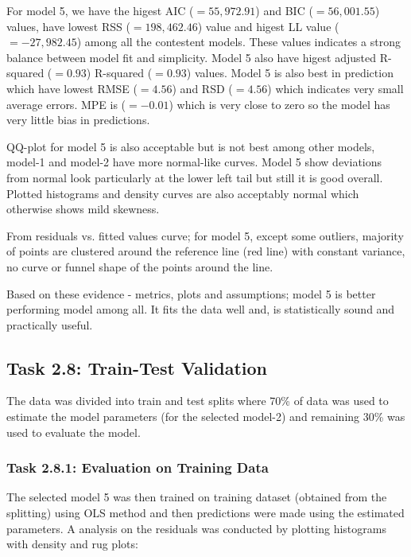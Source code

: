 \documentclass[12pt,a4paper]{article}
\begin{document}
For model 5, we have the higest AIC ($=55,972.91$) and BIC ($=56,001.55$) values, 
have lowest RSS ($=198,462.46$) value and higest LL value ($=-27,982.45$) among 
all the contestent models. These values indicates a strong 
balance between model fit and simplicity. Model 
5 also have higest adjusted R-squared ($=0.93$) R-squared ($=0.93$) values. 
Model 5 is also best in prediction which have lowest 
RMSE ($=4.56$) and RSD ($=4.56$) which indicates  
very small average errors. MPE is ($= -0.01$) 
which is very close to zero so the model 
has very little bias in predictions. 

QQ-plot for model 5 is also acceptable but is not best among other models, model-1 and model-2 have 
more normal-like curves. Model 5 show deviations from normal look particularly at the lower left tail
but still it is good overall. Plotted histograms and density curves are also acceptably normal which 
otherwise shows mild skewness. 

From residuals vs. fitted values curve; for model 5, except some outliers, 
majority of points are clustered around the reference line (red line) 
with constant variance, no curve or funnel shape of the points around 
the line. 

Based on these evidence - metrics, plots and assumptions; 
model 5 is better performing model among all. It fits the 
data well and, is statistically sound and practically 
useful. 


\subsection*{Task 2.8: Train-Test Validation}
The data was divided into train and test splits where 70\% of data was used to estimate
the model parameters (for the selected model-2) and remaining 30\% was used to evaluate the model. 

\subsubsection*{Task 2.8.1: Evaluation on Training Data}
The selected model 5 was then trained on training dataset (obtained from the splitting) using OLS method and 
then predictions were made using the estimated parameters. %
A analysis on the residuals was conducted by plotting histograms with density and rug plots: 
\end{document}
